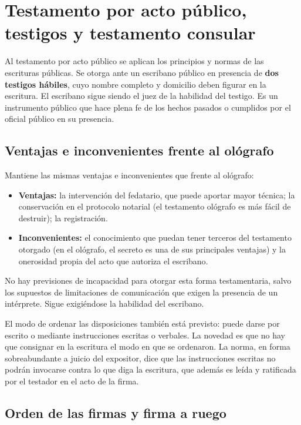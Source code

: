 \documentclass[12pt,oneside]{book}
\begin{document}
\section{Testamento por acto público, testigos y testamento consular}

Al testamento por acto público se aplican los principios y normas de las escrituras públicas. Se otorga ante un escribano público en presencia de \textbf{dos testigos hábiles}, cuyo nombre completo y domicilio deben figurar en la escritura. El escribano sigue siendo el juez de la habilidad del testigo. Es un instrumento público que hace plena fe de los hechos pasados o cumplidos por el oficial público en su presencia.

\subsection{Ventajas e inconvenientes frente al ológrafo}

Mantiene las mismas ventajas e inconvenientes que frente al ológrafo:

\begin{itemize}
    \item \textbf{Ventajas:} la intervención del fedatario, que puede aportar mayor técnica; la conservación en el protocolo notarial (el testamento ológrafo es más fácil de destruir); la registración.
    \item \textbf{Inconvenientes:} el conocimiento que puedan tener terceros del testamento otorgado (en el ológrafo, el secreto es una de sus principales ventajas) y la onerosidad propia del acto que autoriza el escribano.
\end{itemize}

No hay previsiones de incapacidad para otorgar esta forma testamentaria, salvo los supuestos de limitaciones de comunicación que exigen la presencia de un intérprete. Sigue exigiéndose la habilidad del escribano.

El modo de ordenar las disposiciones también está previsto: puede darse por escrito o mediante instrucciones escritas o verbales. La novedad es que no hay que consignar en la escritura el modo en que se ordenaron. La norma, en forma sobreabundante a juicio del expositor, dice que las instrucciones escritas no podrán invocarse contra lo que diga la escritura, que además es leída y ratificada por el testador en el acto de la firma.

\subsection{Orden de las firmas y firma a ruego}
\end{document}
